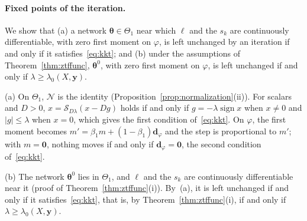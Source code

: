 \documentclass[twoside,11pt]{article}
\newcommand{\bth}{\boldsymbol{\theta}}
\newcommand{\by}{\mathbf{y}}
\newcommand{\bzero}{\mathbf{0}}
\newcommand{\soft}{\mathcal{S}}
\newcommand{\Nrm}{\mathcal{N}}
\newcommand{\Thetaone}{\Theta_{1}}
\begin{document}
\paragraph{Fixed points of the iteration.}
We show that (a) a network $\bth\in\Thetaone$ near which $\ell$ and the $s_k$ are continuously differentiable, with zero first moment on $\varphi$, is left unchanged by an iteration if and only if it satisfies~\eqref{eq:kkt}; and (b) under the assumptions of Theorem~\ref{thm:ztffunc}, $\bth^0$, with zero first moment on $\varphi$, is left unchanged if and only if $\lambda\geq\lambda_0(X,\by)$.

(a) On $\Thetaone$, $\Nrm$ is the identity (Proposition~\ref{prop:normalization}(ii)). For scalars and $D>0$, $x=\soft_{D\lambda}(x-Dg)$ holds if and only if $g=-\lambda\operatorname{sign}x$ when $x\neq0$ and $|g|\leq\lambda$ when $x=0$, which gives the first condition of~\eqref{eq:kkt}. On $\varphi$, the first moment becomes $m'=\beta_1m+(1-\beta_1)\mathbf d_\varphi$ and the step is proportional to $m'$; with $m=\bzero$, nothing moves if and only if $\mathbf d_\varphi=\bzero$, the second condition of~\eqref{eq:kkt}.

(b) The network $\bth^0$ lies in $\Thetaone$, and $\ell$ and the $s_k$ are continuously differentiable near it (proof of Theorem~\ref{thm:ztffunc}(i)). By~(a), it is left unchanged if and only if it satisfies~\eqref{eq:kkt}, that is, by Theorem~\ref{thm:ztffunc}(i), if and only if $\lambda\geq\lambda_0(X,\by)$.

\newpage

\end{document}
